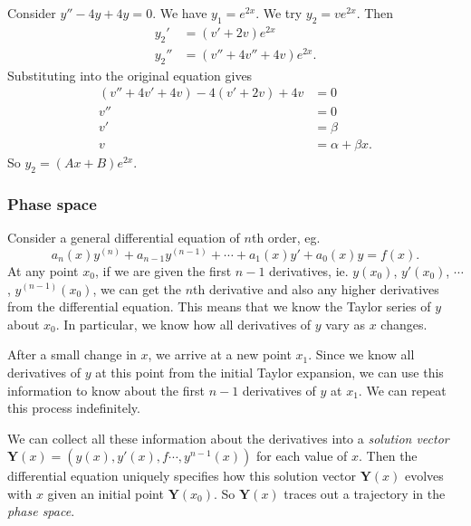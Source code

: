 \documentclass[a4paper]{article}
\begin{document}
\begin{eg}
  Consider $y'' - 4y + 4y = 0$. We have $y_1 = e^{2x}$. We try $y_2 = ve^{2x}$. Then
  \begin{align*}
    y_2' &= (v' + 2v)e^{2x}\\
    y_2'' &= (v'' + 4v'' + 4v)e^{2x}.
  \end{align*}
  Substituting into the original equation gives
  \begin{align*}
    (v'' + 4v' + 4v) - 4(v' + 2v) + 4v &= 0\\
    v'' &= 0\\
    v' &= \beta\\
    v &= \alpha + \beta x.
  \end{align*}
  So $y_2 = (Ax + B)e^{2x}$.
\end{eg}

\subsubsection{Phase space}
Consider a general differential equation of $n$th order, eg.
\[
  a_n(x) y^{(n)} + a_{n - 1}y^{(n - 1)} + \cdots + a_1(x) y' + a_0 (x) y = f(x).
\]
At any point $x_0$, if we are given the first $n - 1$ derivatives, ie. $y(x_0)$, $y'(x_0)$, $\cdots$, $y^{(n - 1)}(x_0)$, we can get the $n$th derivative and also any higher derivatives from the differential equation. This means that we know the Taylor series of $y$ about $x_0$. In particular, we know how all derivatives of $y$ vary as $x$ changes.

After a small change in $x$, we arrive at a new point $x_1$. Since we know all derivatives of $y$ at this point from the initial Taylor expansion, we can use this information to know about the first $n - 1$ derivatives of $y$ at $x_1$. We can repeat this process indefinitely.

We can collect all these information about the derivatives into a \emph{solution vector} $\mathbf{Y}(x) = (y(x), y'(x),f \cdots , y^{n - 1}(x))$ for each value of $x$. Then the differential equation uniquely specifies how this solution vector $\mathbf{Y}(x)$ evolves with $x$ given an initial point $\mathbf{Y}(x_0)$. So $\mathbf{Y}(x)$ traces out a trajectory in the \emph{phase space}.
\end{document}
